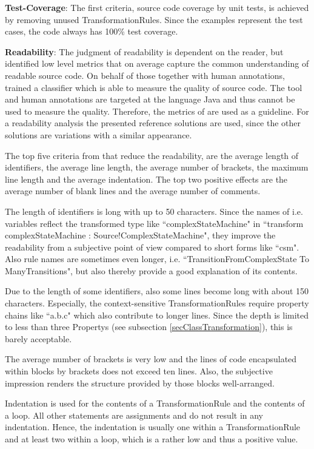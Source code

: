 \textbf{Test-Coverage}: The first criteria, source code coverage by unit tests, is achieved by removing unused \glspl{TransformationRule}. Since the examples represent the test cases, the code always has 100\% test coverage.

\textbf{Readability}: The judgment of readability is dependent on the reader, but \cite{Buse2008} identified low level metrics that on average capture the common understanding of readable source code. On behalf of those together with human annotations, \cite{Buse2008} trained a classifier which is able to measure the quality of source code. The tool and human annotations are targeted at the language Java and thus cannot be used to measure the quality. Therefore, the metrics of \cite{Buse2008} are used as a guideline. For a readability analysis the presented reference solutions are used, since the other solutions are variations with a similar appearance.

The top five criteria from \cite{Buse2008} that reduce the readability, are the average length of identifiers, the average line length, the average number of brackets, the maximum line length and the average indentation. The top two positive effects are the average number of blank lines and the average number of comments. 

The length of identifiers is long with up to 50 characters. Since the names of i.e. variables reflect the transformed type like ``complexStateMachine" in ``transform complexStateMachine : Source!ComplexStateMachine", they improve the readability from a subjective point of view compared to short forms like ``csm". Also rule names are sometimes even longer, i.e. ``TransitionFromComplexState To ManyTransitions", but also thereby provide a good explanation of its contents.

Due to the length of some identifiers, also some lines become long with about 150 characters. Especially, the context-sensitive \glspl{TransformationRule} require property chains like ``a.b.c" which also contribute to longer lines. Since the depth is limited to less than three \glspl{Property} (see subsection \ref{secClassTransformation}), this is barely acceptable.

The average number of brackets is very low and the lines of code encapsulated within blocks by brackets does not exceed ten lines. Also, the subjective impression renders the structure provided by those blocks well-arranged.

Indentation is used for the contents of a \gls{TransformationRule} and the contents of a loop. All other statements are assignments and do not result in any indentation. Hence, the indentation is usually one within a \gls{TransformationRule} and at least two within a loop, which is a rather low and thus a positive value.

